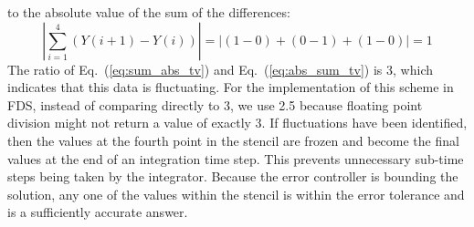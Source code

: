 to the absolute value of the sum of the differences:
\begin{equation}\label{eq:abs_sum_tv}
|\displaystyle \sum_{i=1}^{4}(Y(i+1)-Y(i))| = |(1-0)+(0-1)+(1-0)| = 1
\end{equation}
The ratio of Eq.~(\ref{eq:sum_abs_tv}) and Eq.~(\ref{eq:abs_sum_tv}) is 3, which indicates that this data is fluctuating. For the implementation of this scheme in FDS, instead of comparing directly to 3, we use 2.5 because floating point division might not return a value of exactly 3. If fluctuations have been identified, then the values at the fourth point in the stencil are frozen and become the final values at the end of an integration time step. This prevents unnecessary sub-time steps being taken by the integrator. Because the error controller is bounding the solution, any one of the values within the stencil is within the error tolerance and is a sufficiently accurate answer.

